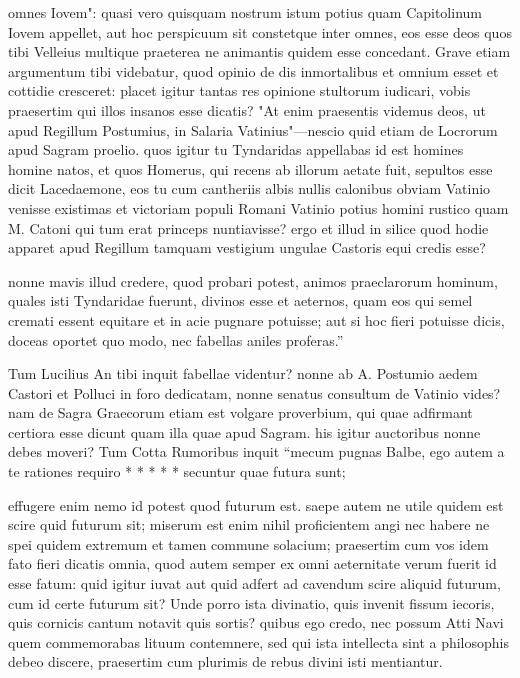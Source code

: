  omnes Iovem": quasi vero quisquam nostrum istum potius quam Capitolinum Iovem appellet, aut hoc perspicuum sit constetque inter omnes, eos esse deos quos tibi Velleius multique praeterea ne animantis quidem esse concedant. Grave etiam argumentum tibi videbatur, quod opinio de dis inmortalibus et omnium esset et cottidie cresceret: placet igitur tantas res opinione stultorum iudicari, vobis praesertim qui illos insanos esse dicatis? "At enim praesentis videmus deos, ut apud Regillum Postumius, in Salaria Vatinius"—nescio quid etiam de Locrorum apud Sagram proelio. quos igitur tu Tyndaridas appellabas id est homines homine natos, et quos Homerus, qui recens ab illorum aetate fuit, sepultos esse dicit Lacedaemone, eos tu cum cantheriis albis nullis calonibus obviam Vatinio venisse existimas et victoriam populi Romani Vatinio potius homini rustico quam M. Catoni qui tum erat princeps nuntiavisse? ergo et illud in silice quod hodie apparet apud Regillum tamquam vestigium ungulae Castoris equi credis esse?

 nonne mavis illud credere, quod probari potest, animos praeclarorum hominum, quales isti Tyndaridae fuerunt, divinos esse et aeternos, quam eos qui semel cremati essent equitare et in acie pugnare potuisse; aut si hoc fieri potuisse dicis, doceas oportet quo modo, nec fabellas aniles proferas.''

 Tum Lucilius An tibi inquit fabellae videntur? nonne ab A. Postumio aedem Castori et Polluci in foro dedicatam, nonne senatus consultum de Vatinio vides? nam de Sagra Graecorum etiam est volgare proverbium, qui quae adfirmant certiora esse dicunt quam illa quae apud Sagram. his igitur auctoribus nonne debes moveri? Tum Cotta Rumoribus inquit ``mecum pugnas Balbe, ego autem a te rationes requiro * * * * * secuntur quae futura sunt;

 effugere enim nemo id potest quod futurum est. saepe autem ne utile quidem est scire quid futurum sit; miserum est enim nihil proficientem angi nec habere ne spei quidem extremum et tamen commune solacium; praesertim cum vos idem fato fieri dicatis omnia, quod autem semper ex omni aeternitate verum fuerit id esse fatum: quid igitur iuvat aut quid adfert ad cavendum scire aliquid futurum, cum id certe futurum sit? Unde porro ista divinatio, quis invenit fissum iecoris, quis cornicis cantum notavit quis sortis? quibus ego credo, nec possum Atti Navi quem commemorabas lituum contemnere, sed qui ista intellecta sint a philosophis debeo discere, praesertim cum plurimis de rebus divini isti mentiantur.

